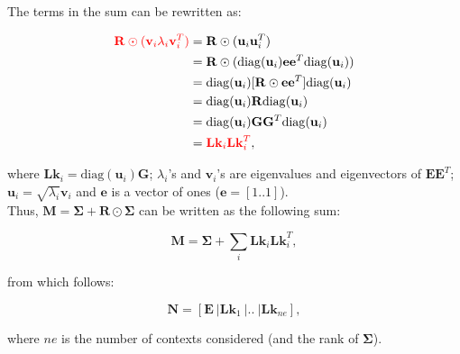 
The terms in the sum can be rewritten as:

\begin{equation}\label{eq:Lk}
    \begin{split}
        \textcolor{red}{\mathbf{R} \odot (\mathbf{v}_i \lambda_i \mathbf{v}_i^T)} 
        & = \mathbf{R} \odot (\mathbf{u}_i \mathbf{u}_i^T) \\
        & = \mathbf{R} \odot (\mathrm{diag}(\mathbf{u}_i) \mathbf{e} \mathbf{e}^T \mathrm{diag}(\mathbf{u}_i)) \\
        & = \mathrm{diag}(\mathbf{u}_i)[\mathbf{R} \odot \mathbf{e} \mathbf{e}^T] \mathrm{diag}(\mathbf{u}_i) \\
        & = \mathrm{diag}(\mathbf{u}_i) \mathbf{R} \mathrm{diag}(\mathbf{u}_i) \\
        & = \mathrm{diag}(\mathbf{u}_i) \mathbf{G} \mathbf{G}^T  \mathrm{diag}(\mathbf{u}_i)  \\
        & = \textcolor{red}{\mathbf{Lk}_i \mathbf{Lk}_i^T},
    \end{split}
\end{equation}

where $\mathbf{Lk}_i = \mathrm{diag}(\mathbf{u}_i) \mathbf{G}$; $\lambda_i$'s and $\mathbf{v}_i$'s are eigenvalues and eigenvectors of $\mathbf{E}\mathbf{E}^T$; $\mathbf{u}_i = \sqrt{\lambda_i}\mathbf{v}_i$ and $\mathbf{e}$ is a vector of ones ($\mathbf{e} = [1..1]$). \\


Thus, $\mathbf{M} = \boldsymbol{\Sigma} + \mathbf{R} \odot \boldsymbol{\Sigma}$ can be written as the following sum:

\begin{equation}
    \mathbf{M} = \boldsymbol{\Sigma} + \sum_i \mathbf{Lk}_i \mathbf{Lk}_i^T,  
\end{equation}

from which follows:

\begin{equation}
    \mathbf{N} = [\mathbf{E} \ | \mathbf{Lk}_1 \ | .. \ | \mathbf{Lk}_{ne}],
\end{equation}

where $ne$ is the number of contexts considered (and the rank of $\boldsymbol{\Sigma}$).




